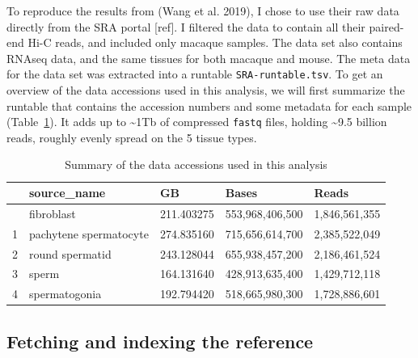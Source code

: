 \documentclass[
  11pt,
  a4paper,
]{scrbook}
\begin{document}
To reproduce the results from (Wang et al. 2019), I chose to use their
raw data directly from the SRA portal {[}ref{]}. I filtered the data to
contain all their paired-end Hi-C reads, and included only macaque
samples. The data set also contains RNAseq data, and the same tissues
for both macaque and mouse. The meta data for the data set was extracted
into a runtable \texttt{SRA-runtable.tsv}. To get an overview of the
data accessions used in this analysis, we will first summarize the
runtable that contains the accession numbers and some metadata for each
sample (Table~\ref{tbl-runtable-summary}). It adds up to
\textasciitilde1Tb of compressed \texttt{fastq} files, holding
\textasciitilde9.5 billion reads, roughly evenly spread on the 5 tissue
types.

\small

\begin{longtable}[]{@{}lllll@{}}

\caption{\label{tbl-runtable-summary}Summary of the data accessions used
in this analysis}

\tabularnewline

\toprule\noalign{}
& source\_name & GB & Bases & Reads \\
\midrule\noalign{}
\endhead
\bottomrule\noalign{}
\endlastfoot
0 & fibroblast & 211.403275 & 553,968,406,500 & 1,846,561,355 \\
1 & pachytene spermatocyte & 274.835160 & 715,656,614,700 &
2,385,522,049 \\
2 & round spermatid & 243.128044 & 655,938,457,200 & 2,186,461,524 \\
3 & sperm & 164.131640 & 428,913,635,400 & 1,429,712,118 \\
4 & spermatogonia & 192.794420 & 518,665,980,300 & 1,728,886,601 \\

\end{longtable}

\normalsize

\subsection{Fetching and indexing the
reference}\label{fetching-and-indexing-the-reference}
\end{document}
